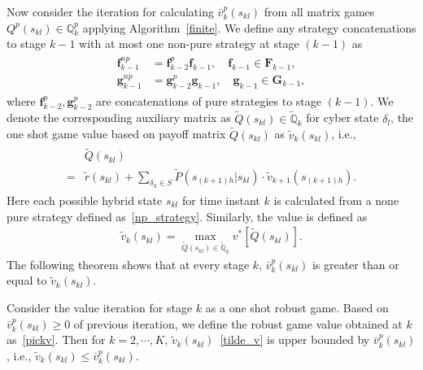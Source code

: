 Now consider the iteration for calculating $\bar{v}^p_{k}(s_{kl})$ from all matrix games $Q^{p}(s_{kl})\in \mathbb{Q}_{k}^p$ applying Algorithm~\ref{finite}. We define any strategy concatenations to stage $k-1$ with at most one non-pure strategy at stage $(k-1)$ as
\begin{align}
\begin{split}
\mathbf{f}^{np}_{k-1}&=\mathbf{f}^p_{k-2}\mathbf{f}_{k-1},\quad \mathbf{f}_{k-1} \in \mathbf{F}_{k-1},\\ \mathbf{g}^{np}_{k-1}&=\mathbf{g}^p_{k-2}\mathbf{g}_{k-1},\quad \mathbf{g}_{k-1} \in \mathbf{G}_{k-1},
\end{split}
\label{np_strategy}
\end{align}
where $\mathbf{f}^p_{k-2},\mathbf{g}^p_{k-2}$ are concatenations of pure strategies to stage $(k-1)$. We denote the corresponding auxiliary matrix as $\tilde{Q}(s_{kl}) \in \tilde{\mathbb{Q}}_k$ for cyber state $\delta_l$, the one shot game value based on payoff matrix $\tilde{Q}(s_{kl})$ as $\tilde{v}_{k}(s_{kl})$, i.e.,
\begin{align}
\begin{split}
&\tilde{Q}(s_{kl}) \\
=&\tilde{r}(s_{kl})+\sum_{\delta_h\in S} \tilde{P}( s_{(k+1)h} |s_{kl})\cdot \tilde{v}_{k+1}(s_{(k+1)h}).
\end{split}
\label{tilde_Q}
\end{align}
Here each possible hybrid state $s_{kl}$ for time instant $k$ is calculated from a none pure strategy defined as~\eqref{np_strategy}. Similarly, the value is defined as
\begin{align}
\tilde{v}_{k}(s_{kl})=\max_{\tilde{Q}(s_{kl})\in \mathbb{\tilde{Q}}_k}v^*[\tilde{Q}(s_{kl})].
\label{tilde_v}
\end{align}
The following theorem shows that at every stage $k$, $\bar{v}_{k}^{p}(s_{kl})$ is greater than or equal to $\tilde{v}_{k}(s_{kl})$.
\\
\begin{thm}
Consider the value iteration for stage $k$ as a one shot robust game. %
Based on $\bar{v}_{k}^{p}(s_{kl}) \geq 0$ of previous iteration, 
we define the robust game value  obtained at $k$ as~\eqref{pickv}. Then for $k=2,\cdots, K$, $\tilde{v}_{k}(s_{kl})$~\eqref{tilde_v} is upper bounded by $\bar{v}_{k}^{p}(s_{kl})$, i.e., $\tilde{v}_{k}(s_{kl}) \leqslant \bar{v}_{k}^{p}(s_{kl}).$
\label{robust}
\end{thm}
